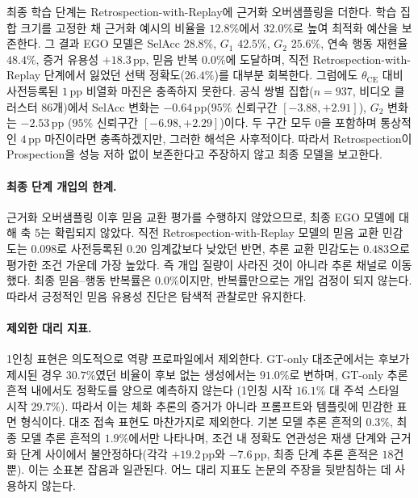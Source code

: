 \documentclass[letterpaper]{article}
\newcommand{\obs}[1]{\textcolor{measuredblue}{#1}}
\newcommand{\pp}{\,\mathrm{pp}}
\newcommand{\method}{\textsc{EGO}}
\begin{document}
최종 학습 단계는 Retrospection-with-Replay에 근거화 오버샘플링을 더한다.
학습 집합 크기를 고정한 채 근거화 예시의 비율을 \obs{$12.8\%$}에서
\obs{$32.0\%$}로 높여 최적화 예산을 보존한다. 그 결과 \method{} 모델은
SelAcc \obs{$28.8\%$}, $G_1$ \obs{$42.5\%$}, $G_2$ \obs{$25.6\%$},
연속 행동 재현율 \obs{$48.4\%$}, 증거 유용성 \obs{$+18.3\pp$}, 믿음 반복
\obs{$0.0\%$}에 도달하며, 직전 Retrospection-with-Replay 단계에서 잃었던
선택 정확도(\obs{$26.4\%$})를 대부분 회복한다. 그럼에도
$\theta_{\mathrm{CE}}$ 대비 사전등록된 \obs{$1\pp$} 비열화 마진은 충족하지
못한다. 공식 쌍별 집합(\obs{$n{=}937$}, 비디오 클러스터 86개)에서
SelAcc 변화는 \obs{$-0.64\pp$}(\obs{$95\%$ 신뢰구간
$[-3.88,+2.91]$}), $G_2$ 변화는 \obs{$-2.53\pp$}
(\obs{$95\%$ 신뢰구간 $[-6.98,+2.29]$})이다. 두 구간 모두 0을 포함하며
통상적인 \obs{$4\pp$} 마진이라면 충족하겠지만, 그러한 해석은 사후적이다.
따라서 Retrospection이
Prospection을 성능 저하 없이 보존한다고 주장하지 않고 최종 모델을 보고한다.

{\color{pendingred}
\paragraph{최종 단계 개입의 한계.}
근거화 오버샘플링 이후 믿음 교환 평가를 수행하지 않았으므로, 최종 \method{}
모델에 대해 축 5는 확립되지 않았다. 직전 Retrospection-with-Replay 모델의
믿음 교환 민감도는 $0.098$로 사전등록된 $0.20$ 임계값보다 낮았던 반면,
추론 교환 민감도는 $0.483$으로 평가한 조건 가운데 가장 높았다.
즉 개입 질량이 사라진 것이 아니라 추론 채널로 이동했다.
최종 믿음--행동 반복률은 $0.0\%$이지만, 반복률만으로는 개입 검정이 되지
않는다. 따라서 긍정적인 믿음 유용성 진단은 탐색적 관찰로만 유지한다.
\par}

{\color{pendingred}
\paragraph{제외한 대리 지표.}
1인칭 표현은 의도적으로 역량 프로파일에서 제외한다. GT-only 대조군에서는 후보가
제시된 경우 $30.7\%$였던 비율이 후보 없는 생성에서는 $91.0\%$로
변하며, GT-only 추론 흔적 내에서도 정확도를 양으로 예측하지 않는다
(1인칭 시작 $16.1\%$ 대 주석 스타일 시작 $29.7\%$).
따라서 이는 체화 추론의 증거가 아니라 프롬프트와 템플릿에 민감한 표면 형식이다.
대조 접속 표현도 마찬가지로 제외한다. 기본 모델 추론 흔적의 $0.3\%$,
최종 모델 추론 흔적의 $1.9\%$에서만 나타나며, 조건 내 정확도 연관성은
재생 단계와 근거화 단계 사이에서 불안정하다(각각 $+19.2\pp$와
$-7.6\pp$, 최종 단계 추론 흔적은 $18$건뿐). 이는 소표본 잡음과 일관된다.
어느 대리 지표도 논문의 주장을 뒷받침하는 데 사용하지 않는다.
\par}
\end{document}
